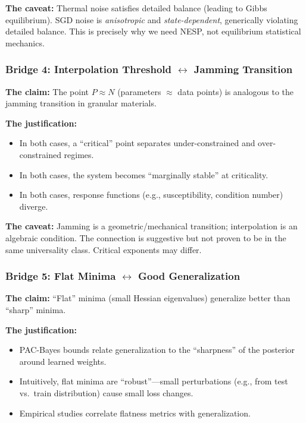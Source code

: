 \documentclass[
  journal=largetwo,
  year=2025,
  volume=37,
]{cup-journal}
\begin{document}
\textbf{The caveat:} Thermal noise satisfies detailed balance (leading to Gibbs equilibrium). SGD noise is \textit{anisotropic} and \textit{state-dependent}, generically violating detailed balance. This is precisely why we need NESP, not equilibrium statistical mechanics.

\subsubsection{Bridge 4: Interpolation Threshold $\leftrightarrow$ Jamming Transition}

\textbf{The claim:} The point $P \approx N$ (parameters $\approx$ data points) is analogous to the jamming transition in granular materials.

\textbf{The justification:}
\begin{itemize}
    \item In both cases, a ``critical'' point separates under-constrained and over-constrained regimes.
    \item In both cases, the system becomes ``marginally stable'' at criticality.
    \item In both cases, response functions (e.g., susceptibility, condition number) diverge.
\end{itemize}

\textbf{The caveat:} Jamming is a geometric/mechanical transition; interpolation is an algebraic condition. The connection is suggestive but not proven to be in the same universality class. Critical exponents may differ.

\subsubsection{Bridge 5: Flat Minima $\leftrightarrow$ Good Generalization}

\textbf{The claim:} ``Flat'' minima (small Hessian eigenvalues) generalize better than ``sharp'' minima.

\textbf{The justification:}
\begin{itemize}
    \item PAC-Bayes bounds relate generalization to the ``sharpness'' of the posterior around learned weights.
    \item Intuitively, flat minima are ``robust''---small perturbations (e.g., from test vs.\ train distribution) cause small loss changes.
    \item Empirical studies correlate flatness metrics with generalization.
\end{itemize}
\end{document}
